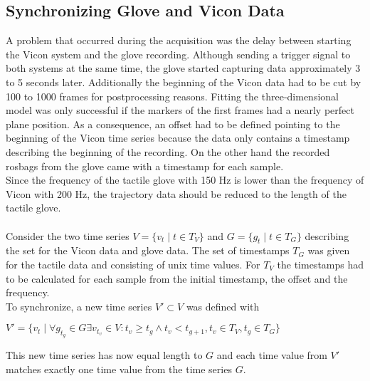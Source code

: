 \subsection{Synchronizing Glove and Vicon Data}
A problem that occurred during the acquisition was the delay between starting the Vicon system and the glove recording. Although sending a trigger signal to both systems at the same time, the glove started capturing data approximately 3 to 5 seconds later. Additionally the beginning of the Vicon data had to be cut by 100 to 1000 frames for postprocessing reasons. Fitting the three-dimensional model was only successful if the markers of the first frames had a nearly perfect plane position. As a consequence, an offset had to be defined pointing to the beginning of the Vicon time series because the data only contains a timestamp describing the beginning of the recording. On the other hand the recorded rosbags from the glove came with a timestamp for each sample.\\
Since the frequency of the tactile glove with 150 Hz is lower than the frequency of Vicon with 200 Hz, the trajectory data should be reduced to the length of the tactile glove.\\
\\
Consider the two time series $V = \{v_{t} \mid t\in T_{V}\}$ and $G = \{g_{t} \mid t\in T_{G}\}$ describing the set for the Vicon data and glove data. The set of timestamps $T_{G}$ was given for the tactile data and consisting of unix time values. For $T_{V}$ the timestamps had to be calculated for each sample from the initial timestamp, the offset and the frequency. \\
To synchronize, a new time series $V' \subset V$ was defined with \begin{center}
$V' = \{v_{t} \mid \forall g_{t_{g}} \in G \exists v_{t_{v}} \in V : t_{v} \geq t_{g} \wedge t_{v} < t_{g+1}, t_{v} \in T_{V}, t_{g} \in T_{G} \}$
\end{center}
This new time series has now equal length to $G$ and each time value from $V'$ matches exactly one time value from the time series $G$.
